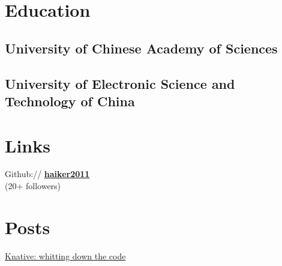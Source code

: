 \documentclass[]{deedy-resume-openfont}
\begin{document}
%
%
\lastupdated

%
%

%
%

\begin{minipage}[t]{0.25\textwidth} 


\section{Education} 

\subsection{University of Chinese Academy of Sciences}
\sectionsep

\subsection{University of Electronic Science and Technology of China}
\sectionsep


\section{Links}
\sectionsep   
Github:// \href{https://github.com/haiker2011}{\bf haiker2011} \\
(20+ followers) \\

\section{Posts}
\sectionsep
\href{http://www.servicemesher.com/blog/knative-whittling-down-the-code/}{Knative: whitting down the code} \\


\end{minipage}
\end{document}
